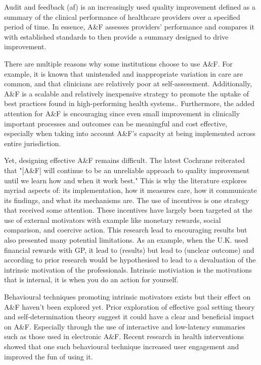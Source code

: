 Audit and feedback (\gls{af}) is an increasingly used quality improvement defined as a summary of the clinical performance of healthcare providers over a specified period of time. In essence, A\&F assesses providers' performance and compares it with established standards to then provide a summary designed to drive improvement.\cite{ivers2012audit}

There are multiple reasons why some institutions choose to use A\&F. For example, it is known that unintended and inappropriate variation in care are common, and that clinicians are relatively poor at self-assessment.\cite{davis2006accuracy} Additionally, A\&F is a scalable and relatively inexpensive strategy to promote the uptake of best practices found in high-performing health systems.\cite{baker2015creating}. Furthermore, the added attention for A\&F is encouraging since even small improvement in clinically important processes and outcomes can be meaningful and cost effective, especially when taking into account A\&F's capacity at being implemented across entire jurisdiction.\cite{ivers2018using}

Yet, designing effective A\&F remains difficult. The latest Cochrane reiterated that "[A\&F] will continue to be an unreliable approach to quality improvement until we learn how and when it work best."\cite{foy2005we} This is why the literature explores myriad aspects of: its implementation, how it measures care, how it communicate its findings, and what its mechanisms are. The use of incentives is one strategy that received some attention. These incentives have largely been targeted at the use of external motivators with example like monetary rewards, social comparison, and coercive action. This research lead to encouraging results but also presented many potential limitations. As an example, when the U.K. used financial rewards with GP, it lead to (results) but lead to (unclear outcome) and according to prior research would be hypothesised to lead to a devaluation of the intrinsic motivation of the professionals. Intrinsic motiviation is the motivations that is internal, it is when you do an action for yourself.

Behavioural techniques promoting intrinsic motivators exists but their effect on A\&F haven't been explored yet. Prior exploration of effective goal setting theory and self-determination theory suggest it could have a clear and beneficial impact on A\&F. Especially through the use of interactive and low-latency summaries such as those used in electronic A\&F. Recent research in health interventions showed that one such behavioural technique increased user engagement and improved the fun of using it.
